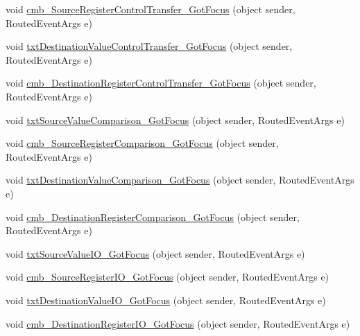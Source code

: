 \begin{DoxyCompactItemize}
\item 
void \hyperlink{class_c_p_u___o_s___simulator_1_1_instructions_window_a035689dfb95c248b0cadb714a326b714}{cmb\+\_\+\+Source\+Register\+Control\+Transfer\+\_\+\+Got\+Focus} (object sender, Routed\+Event\+Args e)
\item 
void \hyperlink{class_c_p_u___o_s___simulator_1_1_instructions_window_ab9695cfa485c6cd4f6d941c93105187b}{txt\+Destination\+Value\+Control\+Transfer\+\_\+\+Got\+Focus} (object sender, Routed\+Event\+Args e)
\item 
void \hyperlink{class_c_p_u___o_s___simulator_1_1_instructions_window_a5f5a0d30cab0406f864a56163f7996ba}{cmb\+\_\+\+Destination\+Register\+Control\+Transfer\+\_\+\+Got\+Focus} (object sender, Routed\+Event\+Args e)
\item 
void \hyperlink{class_c_p_u___o_s___simulator_1_1_instructions_window_a7fc4519d09df6fde91777a5a56101b92}{txt\+Source\+Value\+Comparison\+\_\+\+Got\+Focus} (object sender, Routed\+Event\+Args e)
\item 
void \hyperlink{class_c_p_u___o_s___simulator_1_1_instructions_window_a832c901ee54eaab86d0a10cac789e114}{cmb\+\_\+\+Source\+Register\+Comparison\+\_\+\+Got\+Focus} (object sender, Routed\+Event\+Args e)
\item 
void \hyperlink{class_c_p_u___o_s___simulator_1_1_instructions_window_a2f346b8f78940a1626ab5419af3973ef}{txt\+Destination\+Value\+Comparison\+\_\+\+Got\+Focus} (object sender, Routed\+Event\+Args e)
\item 
void \hyperlink{class_c_p_u___o_s___simulator_1_1_instructions_window_a867a9b46a598bfb0b067da68707961ca}{cmb\+\_\+\+Destination\+Register\+Comparison\+\_\+\+Got\+Focus} (object sender, Routed\+Event\+Args e)
\item 
void \hyperlink{class_c_p_u___o_s___simulator_1_1_instructions_window_a83fbca00e890edc28dd3d58c350360eb}{txt\+Source\+Value\+I\+O\+\_\+\+Got\+Focus} (object sender, Routed\+Event\+Args e)
\item 
void \hyperlink{class_c_p_u___o_s___simulator_1_1_instructions_window_a7046f3fb03ffcc336bcc0af4db5857de}{cmb\+\_\+\+Source\+Register\+I\+O\+\_\+\+Got\+Focus} (object sender, Routed\+Event\+Args e)
\item 
void \hyperlink{class_c_p_u___o_s___simulator_1_1_instructions_window_a0d69d4710419b9efea12396940b60e89}{txt\+Destination\+Value\+I\+O\+\_\+\+Got\+Focus} (object sender, Routed\+Event\+Args e)
\item 
void \hyperlink{class_c_p_u___o_s___simulator_1_1_instructions_window_a565cca857d005347574918cdc5cab5b9}{cmb\+\_\+\+Destination\+Register\+I\+O\+\_\+\+Got\+Focus} (object sender, Routed\+Event\+Args e)

\end{DoxyCompactItemize}
